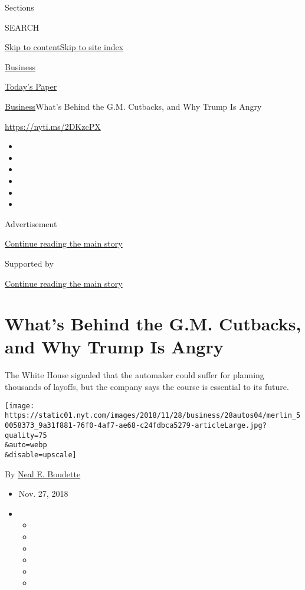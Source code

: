 Sections

SEARCH

\protect\hyperlink{site-content}{Skip to
content}\protect\hyperlink{site-index}{Skip to site index}

\href{https://www.nytimes.com/section/business}{Business}

\href{https://myaccount.nytimes.com/auth/login?response_type=cookie\&client_id=vi}{}

\href{https://www.nytimes.com/section/todayspaper}{Today's Paper}

\href{/section/business}{Business}\textbar{}What's Behind the G.M.
Cutbacks, and Why Trump Is Angry

\url{https://nyti.ms/2DKzcPX}

\begin{itemize}
\item
\item
\item
\item
\item
\item
\end{itemize}

Advertisement

\protect\hyperlink{after-top}{Continue reading the main story}

Supported by

\protect\hyperlink{after-sponsor}{Continue reading the main story}

\hypertarget{whats-behind-the-gm-cutbacks-and-why-trump-is-angry}{%
\section{What's Behind the G.M. Cutbacks, and Why Trump Is
Angry}\label{whats-behind-the-gm-cutbacks-and-why-trump-is-angry}}

The White House signaled that the automaker could suffer for planning
thousands of layoffs, but the company says the course is essential to
its future.

\texttt{[image: https://static01.nyt.com/images/2018/11/28/business/28autos04/merlin\_50058373\_9a31f881-76f0-4af7-ae68-c24fdbca5279-articleLarge.jpg?quality=75\\\&auto=webp\\\&disable=upscale]}

By \href{https://www.nytimes.com/by/neal-e-boudette}{Neal E. Boudette}

\begin{itemize}
\item
  Nov. 27, 2018
\item
  \begin{itemize}
  \item
  \item
  \item
  \item
  \item
  \item
  \end{itemize}
\end{itemize}

